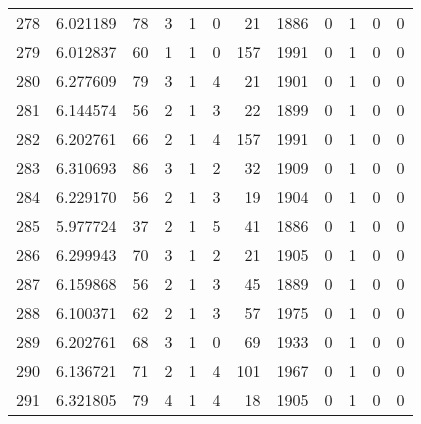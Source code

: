 \begin{tabular}{lrrrrrrrrrrr}
278 &  6.021189 &   78 &      3 &        1 &      0 &              21 &  1886 &               0 &               1 &               0 &               0 \\
279 &  6.012837 &   60 &      1 &        1 &      0 &             157 &  1991 &               0 &               1 &               0 &               0 \\
280 &  6.277609 &   79 &      3 &        1 &      4 &              21 &  1901 &               0 &               1 &               0 &               0 \\
281 &  6.144574 &   56 &      2 &        1 &      3 &              22 &  1899 &               0 &               1 &               0 &               0 \\
282 &  6.202761 &   66 &      2 &        1 &      4 &             157 &  1991 &               0 &               1 &               0 &               0 \\
283 &  6.310693 &   86 &      3 &        1 &      2 &              32 &  1909 &               0 &               1 &               0 &               0 \\
284 &  6.229170 &   56 &      2 &        1 &      3 &              19 &  1904 &               0 &               1 &               0 &               0 \\
285 &  5.977724 &   37 &      2 &        1 &      5 &              41 &  1886 &               0 &               1 &               0 &               0 \\
286 &  6.299943 &   70 &      3 &        1 &      2 &              21 &  1905 &               0 &               1 &               0 &               0 \\
287 &  6.159868 &   56 &      2 &        1 &      3 &              45 &  1889 &               0 &               1 &               0 &               0 \\
288 &  6.100371 &   62 &      2 &        1 &      3 &              57 &  1975 &               0 &               1 &               0 &               0 \\
289 &  6.202761 &   68 &      3 &        1 &      0 &              69 &  1933 &               0 &               1 &               0 &               0 \\
290 &  6.136721 &   71 &      2 &        1 &      4 &             101 &  1967 &               0 &               1 &               0 &               0 \\
291 &  6.321805 &   79 &      4 &        1 &      4 &              18 &  1905 &               0 &               1 &               0 &               0 \\

\end{tabular}
